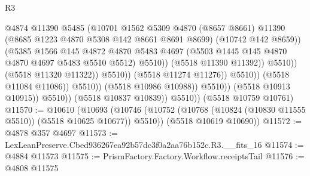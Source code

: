 \begin{lexlean}{R3}
\begin{coremodule}
                                                @4874
                                                @11390
                                                @5485
                                                (@10701
                                                  @1562
                                                  @5309
                                                  @4870
                                                  (@8657 @8661)
                                                  @11390
                                                  (@8685 @1223 @4870 @5308 @142 @8661 @8691 @8699)
                                                  (@10742 @142 @8659))
                                                (@5385
                                                  @1566
                                                  @145
                                                  @4872
                                                  @4870
                                                  @5483
                                                  @4697
                                                  (@5503
                                                    @1445
                                                    @145
                                                    @4870
                                                    @4870
                                                    @4697
                                                    @5483
                                                    @5510
                                                    @5512)
                                                  @5510))
                                              (@5518 @11390 @11392))
                                            @5510))
                                        (@5518 @11320 @11322))
                                      @5510))
                                  (@5518 @11274 @11276))
                                @5510))
                            (@5518 @11084 @11086))
                          @5510))
                      (@5518 @10986 @10988))
                    @5510))
                (@5518 @10913 @10915))
              @5510))
          (@5518 @10837 @10839))
        @5510))
    (@5518 @10759 @10761)
@11570 := @10610
    (@10693
      (@10746 (@10752 (@10768 (@10824 (@10830 @11555 @5510)) (@5518 @10625 @10677)) @5510))
      (@5518 @10619 @10690))
@11572 := @4878 @357 @4697
@11573 := LexLeanPreserve.Cbed936267ea92b57dc3f0a2aa76b152c.R3.__fits_16
@11574 := @4884 @11573
@11575 := PrismFactory.Factory.Workflow.receiptsTail
@11576 := @4808 @11575

\end{coremodule}
\end{lexlean}

